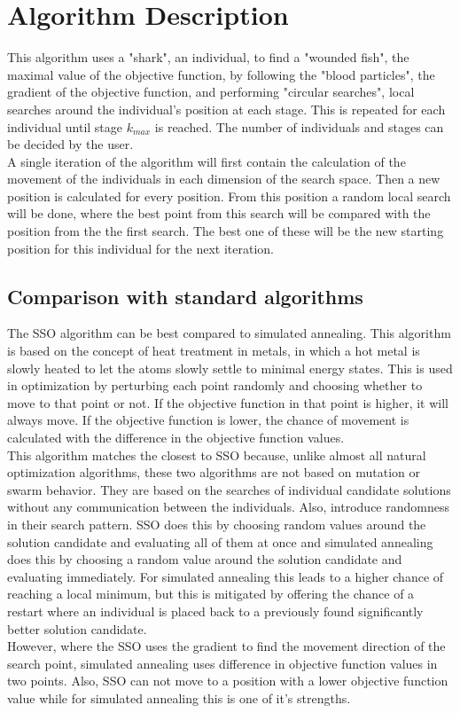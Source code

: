 \documentclass[runningheads]{llncs}
\begin{document}
\section{Algorithm Description} \label{sec:description}
This algorithm uses a "shark", an individual, to find a "wounded fish", the maximal value of the objective function, by following the "blood particles", the gradient of the objective function, and performing "circular searches", local searches around the individual's position at each stage. This is repeated for each individual until stage $k_{max}$ is reached. The number of individuals and stages can be decided by the user. \\
A single iteration of the algorithm will first contain the calculation of the movement of the individuals in each dimension of the search space. Then a new position is calculated for every position. From this position a random local search will be done, where the best point from this search will be compared with the position from the the first search. The best one of these will be the new starting position for this individual for the next iteration.


\subsection{Comparison with standard algorithms}
The SSO algorithm can be best compared to simulated annealing. This algorithm is based on the concept of heat treatment in metals, in which a hot metal is slowly heated to let the atoms slowly settle to minimal energy states. This is used in optimization by perturbing each point randomly and choosing whether to move to that point or not. If the objective function in that point is higher, it will always move. If the objective function is lower, the chance of movement is calculated with the difference in the objective function values.\\
This algorithm matches the closest to SSO because, unlike almost all natural optimization algorithms, these two algorithms are not based on mutation or swarm behavior. They are based on the searches of individual candidate solutions without any communication between the individuals. Also, introduce randomness in their search pattern. SSO does this by choosing random values around the solution candidate and evaluating all of them at once and simulated annealing does this by choosing a random value around the solution candidate and evaluating immediately. For simulated annealing this leads to a higher chance of reaching a local minimum, but this is mitigated by offering the chance of a restart where an individual is placed back to a previously found significantly better solution candidate.\\
However, where the SSO uses the gradient to find the movement direction of the search point, simulated annealing uses difference in objective function values in two points. Also, SSO can not move to a position with a lower objective function value while for simulated annealing this is one of it's strengths.\\
\end{document}
